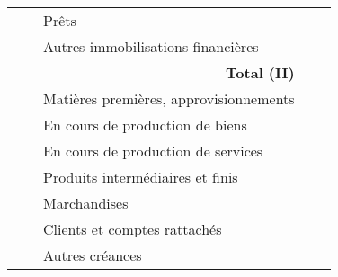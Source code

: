 \begin{table}[h]
\begin{tabular}{|l|p{0.2cm}|p{6cm}|c|c|}
\cline{3-5}                                                                             
    &             &  Prêts	                                     &     &   \\ 
\cline{3-5}                                                                             
    &             &  Autres immobilisations financières	                                     &     &   \\ 
\cline{1-5}         
      \multicolumn{3}{|r|}{\textbf{Total (II)}}        &     &   \\ 
\hline                                                                                                                                                                
\parbox[t]{2mm}{} 
    & \parbox[t]{0.5cm}{} 
                 &  Matières premières, approvisionnements                                               &     &   \\ 
    &             &  En cours de production de biens	                                           &     &   \\ 
    &             &  En cours de production de services                                       &     &   \\ 
    &             &  Produits intermédiaires et finis                                              &     &   \\ 
    &             &  Marchandises	                                                  &     &   \\ 
    & \parbox[t]{0.5cm}{} 
                  &  Clients et comptes rattachés                                            &     &   \\ 
    &             &  Autres créances	                                     &     &   \\

\end{tabular}
\end{table}
